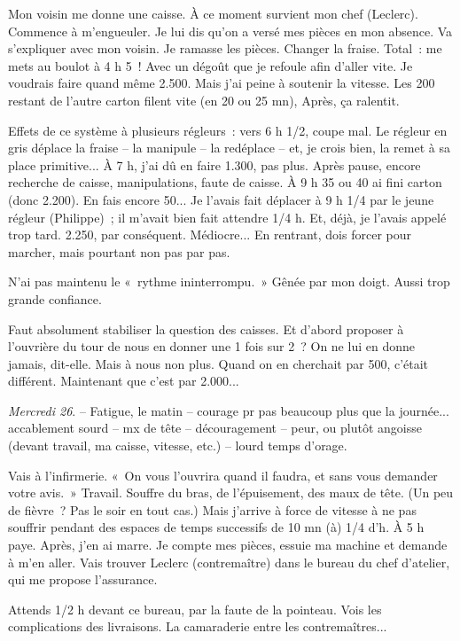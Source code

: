 \documentclass[french,twoside]{book} %
\begin{document}
Mon voisin me donne une caisse. À ce moment survient mon chef (Leclerc). Commence à m'engueuler. Je lui dis qu'on a versé mes pièces en mon absence. Va s'expliquer avec mon voisin. Je ramasse les pièces. Changer la fraise. Total : me mets au boulot à 4 h 5 ! Avec un dégoût que je refoule afin d'aller vite. Je voudrais faire quand même 2.500. Mais j'ai peine à soutenir la vitesse. Les 200 restant de l'autre carton filent vite (en 20 ou 25 mn), Après, ça ralentit.\par
Effets de ce système à plusieurs régleurs : vers 6 h 1/2, coupe mal. Le régleur en gris déplace la fraise – la manipule – la redéplace – et, je crois bien, la remet à sa place primitive... À 7 h, j'ai dû en faire 1.300, pas plus. Après pause, encore recherche de caisse, manipulations, faute de caisse. À 9 h 35 ou 40 ai fini carton (donc 2.200). En fais encore 50... Je l'avais fait déplacer à 9 h 1/4 par le jeune régleur (Philippe) ; il m'avait bien fait attendre 1/4 h. Et, déjà, je l'avais appelé trop tard. 2.250, par conséquent. Médiocre... En rentrant, dois forcer pour marcher, mais pourtant non pas par pas.\par
N'ai pas maintenu le « rythme ininterrompu. » Gênée par mon doigt. Aussi trop grande confiance.\par
Faut absolument stabiliser la question des caisses. Et d'abord proposer à l'ouvrière du tour de nous en donner une 1 fois sur 2 ? On ne lui en donne jamais, dit-elle. Mais à nous non plus. Quand on en cherchait par 500, c'était différent. Maintenant que c'est par 2.000...\par
{\itshape Mercredi 26}. – Fatigue, le matin – courage pr pas beaucoup plus que la journée... accablement sourd – mx de tête – découragement – peur, ou plutôt angoisse (devant travail, ma caisse, vitesse, etc.) – lourd temps d'orage.\par
Vais à l'infirmerie. « On vous l'ouvrira quand il faudra, et sans vous demander votre avis. » Travail. Souffre du bras, de l'épuisement, des maux de tête. (Un peu de fièvre ? Pas le soir en tout cas.) Mais j'arrive à force de vitesse à ne pas souffrir pendant des espaces de temps successifs de 10 mn (à) 1/4 d'h. À 5 h paye. Après, j'en ai marre. Je compte mes pièces, essuie ma machine et demande à m'en aller. Vais trouver Leclerc (contremaître) dans le bureau du chef d'atelier, qui me propose l'assurance.\par
Attends 1/2 h devant ce bureau, par la faute de la pointeau. Vois les complications des livraisons. La camaraderie entre les contremaîtres...\par
\end{document}
